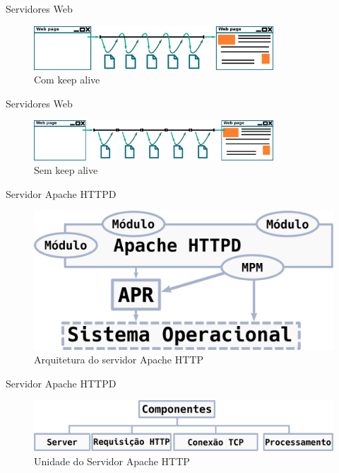 \documentclass[xcolor={usenames,svgnames,dvipsnames},brazil,english,12pt,aspectratio=149]{beamer}
\begin{document}
\begin{frame}{Servidores Web}
	\begin{figure}[!h]
		\centering
		\includegraphics[width=0.8\textwidth]{keep_alive}
		\caption{Com keep alive}
		\label{fig:keep_alive}
	\end{figure}
\end{frame}

\begin{frame}{Servidores Web}
	\begin{figure}[!h]
		\centering
		\includegraphics[width=0.8\textwidth]{no_keep_alive}
		\caption{Sem keep alive}
		\label{fig:no_keep_alive}
	\end{figure}
\end{frame}

\begin{frame}{Servidor Apache HTTPD}
	\begin{figure}[!h]
		\centering
		\includegraphics[width=.7\textwidth]{apache_arhitecture} 
		\caption{Arquitetura do servidor Apache HTTP}
		\label{fig:apache_architecture} 
	\end{figure}
\end{frame}

\begin{frame}{Servidor Apache HTTPD}
	\begin{figure}[!h]
		\centering
		\includegraphics[width=.7\textwidth]{units} 
		\caption{Unidade do Servidor Apache HTTP}
		\label{fig:units} 
	\end{figure}
\end{frame}
\end{document}
